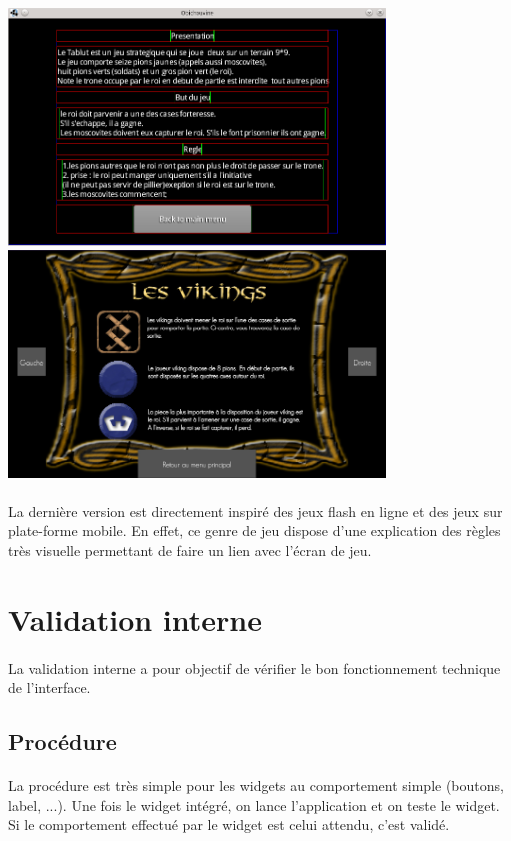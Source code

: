 \documentclass[11pt]{article} %
\begin{document}
\begin{sffamily}
\begin{center}
\includegraphics[width=10cm]{snapshot8.png}
\includegraphics[width=10cm]{validDoc4.jpg}
\end{center}
\paragraph{}
La dernière version est directement inspiré des jeux flash en ligne et des jeux sur plate-forme mobile. En effet, ce genre de jeu dispose d'une explication des règles très visuelle permettant de faire un lien avec l'écran de jeu.

\section{Validation interne}
\paragraph{}
La validation interne a pour objectif de vérifier le bon fonctionnement technique de l'interface.

\subsection{Procédure}
\paragraph{}
La procédure est très simple pour les widgets au comportement simple (boutons, label, ...). Une fois le widget intégré, on lance l'application et on teste le widget. Si le comportement effectué par le widget est celui attendu, c'est validé.

\end{sffamily}
\end{document}
